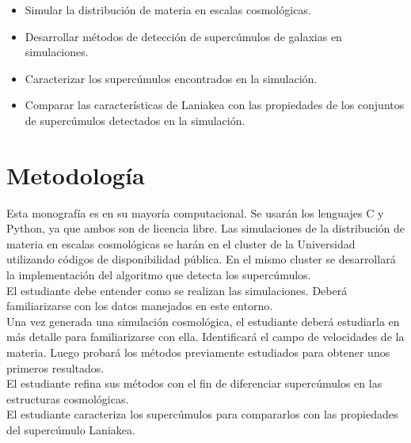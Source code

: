 \documentclass[12pt]{article}
\begin{document}
\begin{itemize}
	\item Simular la distribuci\'on de materia en escalas
          cosmol\'{o}gicas. 
	\item Desarrollar m\'{e}todos de detecci\'on de
          superc\'{u}mulos de galaxias en simulaciones.
	\item Caracterizar los superc\'umulos encontrados en la
          simulaci\'on.
        \item Comparar las caracter\'isticas de Laniakea con las
          propiedades de los conjuntos de superc\'umulos detectados en
          la simulaci\'on.
\end{itemize}

\section{Metodolog\'{i}a}

Esta monograf\'{i}a es en su mayor\'{i}a computacional. 
Se usar\'{a}n los lenguajes C y Python, ya que ambos son de licencia
libre. 
Las simulaciones de la distribuci\'on de materia en escalas
cosmol\'ogicas se har\'an en el cluster de la Universidad utilizando
c\'odigos de disponibilidad p\'ublica.
En el mismo cluster se desarrollar\'a la implementaci\'on del
algoritmo que detecta los superc\'umulos.
\\

El estudiante debe entender como se realizan las
simulaciones. Deber\'{a} familiarizarse con los datos manejados en
este entorno.  
\\

Una vez generada una simulaci\'on cosmol\'{o}gica, el estudiante
deber\'{a} estudiarla en m\'{a}s detalle para familiarizarse con
ella. Identificar\'{a} el campo de velocidades de la materia. 
Luego probar\'{a} los m\'{e}todos previamente estudiados para obtener unos
primeros resultados.  
\\

El estudiante refina sus m\'{e}todos con el fin de diferenciar
superc\'{u}mulos en las estructuras cosmol\'{o}gicas. 
\\

El estudiante caracteriza los superc\'umulos para compararlos con las
propiedades del superc\'umulo Laniakea.
\end{document}
